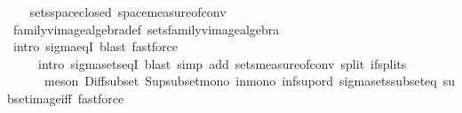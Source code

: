 \begin{isabellebody}
%
\isadelimproof
\ \ %
\endisadelimproof
%
\isatagproof
{}\isamarkupfalse%
\ sets{\isachardot}{\kern0pt}space{\isacharunderscore}{\kern0pt}closed\ space{\isacharunderscore}{\kern0pt}measure{\isacharunderscore}{\kern0pt}of{\isacharunderscore}{\kern0pt}conv\ \isanewline
\ \ \isamarkupfalse%
\ family{\isacharunderscore}{\kern0pt}vimage{\isacharunderscore}{\kern0pt}algebra{\isacharunderscore}{\kern0pt}def\ sets{\isacharunderscore}{\kern0pt}family{\isacharunderscore}{\kern0pt}vimage{\isacharunderscore}{\kern0pt}algebra\isanewline
\ \ \isamarkupfalse%
\ {\isacharparenleft}{\kern0pt}intro\ sigma{\isacharunderscore}{\kern0pt}eqI{\isacharcomma}{\kern0pt}\ blast{\isacharcomma}{\kern0pt}\ fastforce{\isacharparenright}{\kern0pt}\isanewline
\ \ \ \ \ {\isacharparenleft}{\kern0pt}intro\ sigma{\isacharunderscore}{\kern0pt}sets{\isacharunderscore}{\kern0pt}eqI{\isacharcomma}{\kern0pt}\ blast{\isacharcomma}{\kern0pt}\ simp\ add{\isacharcolon}{\kern0pt}\ sets{\isacharunderscore}{\kern0pt}measure{\isacharunderscore}{\kern0pt}of{\isacharunderscore}{\kern0pt}conv\ split{\isacharcolon}{\kern0pt}\ if{\isacharunderscore}{\kern0pt}splits{\isacharcomma}{\kern0pt}\ \isanewline
\ \ \ \ \ \ meson\ Diff{\isacharunderscore}{\kern0pt}subset\ Sup{\isacharunderscore}{\kern0pt}subset{\isacharunderscore}{\kern0pt}mono\ in{\isacharunderscore}{\kern0pt}mono\ inf{\isacharunderscore}{\kern0pt}sup{\isacharunderscore}{\kern0pt}ord{\isacharparenleft}{\kern0pt}{}{\isacharparenright}{\kern0pt}\ sigma{\isacharunderscore}{\kern0pt}sets{\isacharunderscore}{\kern0pt}subseteq\ subset{\isacharunderscore}{\kern0pt}image{\isacharunderscore}{\kern0pt}iff{\isacharcomma}{\kern0pt}\ fastforce{\isacharplus}{\kern0pt}{\isacharparenright}{\kern0pt}%
\endisatagproof
{\isafoldproof}%
%
\isadelimproof
\isanewline
%
\endisadelimproof
%
\isadelimtheory
\isanewline
%
\endisadelimtheory
%
\isatagtheory
{}\isamarkupfalse%
%
\endisatagtheory
{\isafoldtheory}%
%
\isadelimtheory
%
\endisadelimtheory
%
\end{isabellebody}%
\endinput
